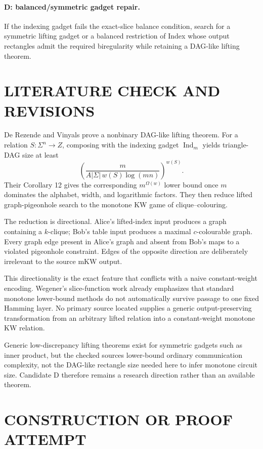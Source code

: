 \documentclass[11pt]{article}
\begin{document}
\paragraph{D: balanced/symmetric gadget repair.}
If the indexing gadget fails the exact-slice balance condition, search for a symmetric lifting gadget or a balanced restriction of Index whose output rectangles admit the required biregularity while retaining a DAG-like lifting theorem.

\section{LITERATURE CHECK AND REVISIONS}
De Rezende and Vinyals prove a nonbinary DAG-like lifting theorem. For a relation $S:\Sigma^n\to Z$, composing with the indexing gadget $\operatorname{Ind}_m$ yields triangle-DAG size at least
\[
\left(\frac{m}{A|\Sigma|\,w(S)\log(mn)}\right)^{w(S)}.
\]
Their Corollary 12 gives the corresponding $m^{\Omega(w)}$ lower bound once $m$ dominates the alphabet, width, and logarithmic factors. They then reduce lifted graph-pigeonhole search to the monotone KW game of clique--colouring.

The reduction is directional. Alice's lifted-index input produces a graph containing a $k$-clique; Bob's table input produces a maximal $c$-colourable graph. Every graph edge present in Alice's graph and absent from Bob's maps to a violated pigeonhole constraint. Edges of the opposite direction are deliberately irrelevant to the source mKW output.

This directionality is the exact feature that conflicts with a naive constant-weight encoding. Wegener's slice-function work already emphasizes that standard monotone lower-bound methods do not automatically survive passage to one fixed Hamming layer. No primary source located supplies a generic output-preserving transformation from an arbitrary lifted relation into a constant-weight monotone KW relation.

Generic low-discrepancy lifting theorems exist for symmetric gadgets such as inner product, but the checked sources lower-bound ordinary communication complexity, not the DAG-like rectangle size needed here to infer monotone circuit size. Candidate D therefore remains a research direction rather than an available theorem.

\section{CONSTRUCTION OR PROOF ATTEMPT}
\end{document}
